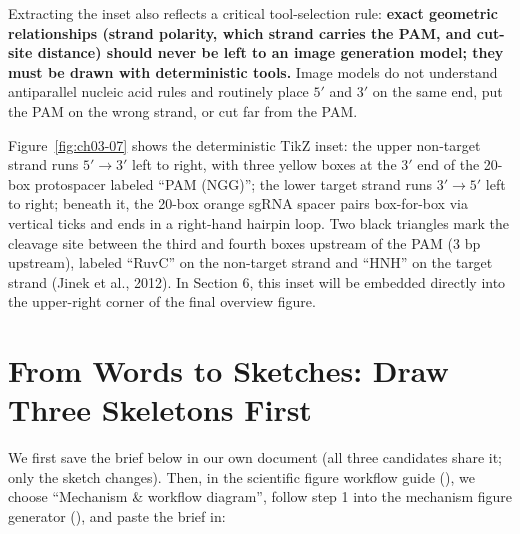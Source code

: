 Extracting the inset also reflects a critical tool-selection rule: \textbf{exact geometric relationships (strand polarity, which strand carries the PAM, and cut-site distance) should never be left to an image generation model; they must be drawn with deterministic tools.} Image models do not understand antiparallel nucleic acid rules and routinely place $5'$ and $3'$ on the same end, put the PAM on the wrong strand, or cut far from the PAM.

Figure~\ref{fig:ch03-07} shows the deterministic TikZ inset: the upper non-target strand runs $5'\rightarrow 3'$ left to right, with three yellow boxes at the $3'$ end of the 20-box protospacer labeled ``PAM (NGG)''; the lower target strand runs $3'\rightarrow 5'$ left to right; beneath it, the 20-box orange sgRNA spacer pairs box-for-box via vertical ticks and ends in a right-hand hairpin loop. Two black triangles mark the cleavage site between the third and fourth boxes upstream of the PAM (3 bp upstream), labeled ``RuvC'' on the non-target strand and ``HNH'' on the target strand (Jinek et al., 2012). In Section 6, this inset will be embedded directly into the upper-right corner of the final overview figure.

\section{From Words to Sketches: Draw Three Skeletons First}

We first save the brief below in our own document (all three candidates share it; only the sketch changes). Then, in the \scidraw{} scientific figure workflow guide (), we choose ``Mechanism \& workflow diagram'', follow step 1 into the mechanism figure generator (), and paste the brief in:

